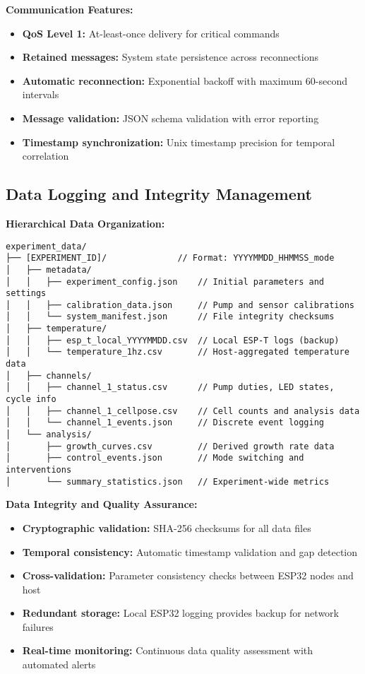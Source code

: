 \textbf{Communication Features:}
\begin{itemize}
\item \textbf{QoS Level 1:} At-least-once delivery for critical commands
\item \textbf{Retained messages:} System state persistence across reconnections
\item \textbf{Automatic reconnection:} Exponential backoff with maximum 60-second intervals
\item \textbf{Message validation:} JSON schema validation with error reporting
\item \textbf{Timestamp synchronization:} Unix timestamp precision for temporal correlation
\end{itemize}

\subsection{Data Logging and Integrity Management}

\textbf{Hierarchical Data Organization:}

\begin{verbatim}
experiment_data/
├── [EXPERIMENT_ID]/              // Format: YYYYMMDD_HHMMSS_mode
│   ├── metadata/
│   │   ├── experiment_config.json    // Initial parameters and settings
│   │   ├── calibration_data.json     // Pump and sensor calibrations
│   │   └── system_manifest.json      // File integrity checksums
│   ├── temperature/
│   │   ├── esp_t_local_YYYYMMDD.csv  // Local ESP-T logs (backup)
│   │   └── temperature_1hz.csv       // Host-aggregated temperature data
│   ├── channels/
│   │   ├── channel_1_status.csv      // Pump duties, LED states, cycle info
│   │   ├── channel_1_cellpose.csv    // Cell counts and analysis data
│   │   └── channel_1_events.json     // Discrete event logging
│   └── analysis/
│       ├── growth_curves.csv         // Derived growth rate data
│       ├── control_events.json       // Mode switching and interventions
│       └── summary_statistics.json   // Experiment-wide metrics
\end{verbatim}

\textbf{Data Integrity and Quality Assurance:}
\begin{itemize}
\item \textbf{Cryptographic validation:} SHA-256 checksums for all data files
\item \textbf{Temporal consistency:} Automatic timestamp validation and gap detection
\item \textbf{Cross-validation:} Parameter consistency checks between ESP32 nodes and host
\item \textbf{Redundant storage:} Local ESP32 logging provides backup for network failures
\item \textbf{Real-time monitoring:} Continuous data quality assessment with automated alerts
\end{itemize}

